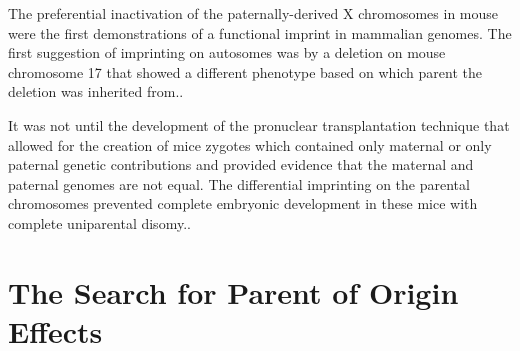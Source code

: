 The preferential inactivation of the paternally-derived X chromosomes in mouse were the first demonstrations of a functional imprint in mammalian genomes\cite{Takagi:1975ua,Lyon:1984gh,Chandra:1975tb}. The first suggestion of imprinting on autosomes was by a deletion on mouse chromosome 17 that showed a different phenotype based on which parent the deletion was inherited from.\cite{Johnson:1974uf,Johnson:1974kc}.

It was not until the development of the pronuclear transplantation technique that allowed for the creation of mice zygotes which contained only maternal or only paternal genetic contributions and provided evidence that the maternal and paternal genomes are not equal. The differential imprinting on the parental chromosomes prevented complete embryonic development in these mice with complete uniparental disomy.\cite{Sapienza:1989vm,McGrath:1984ky}.



\section{The Search for Parent of Origin Effects}


